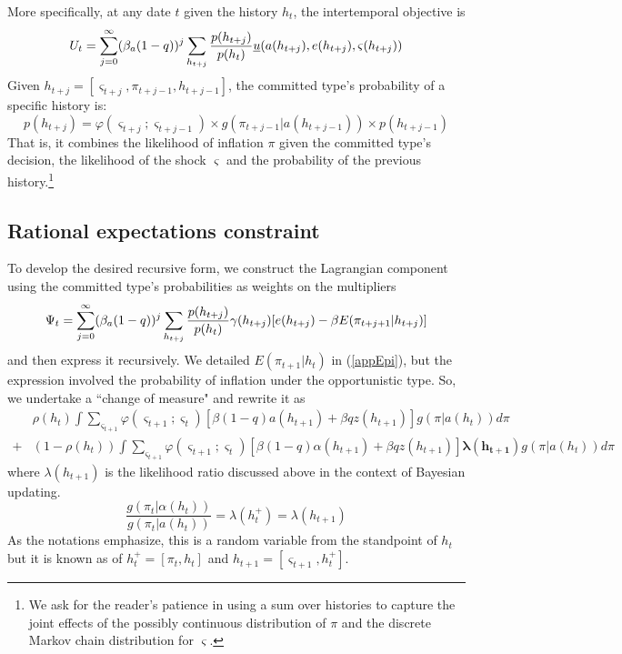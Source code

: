 \documentclass[12pt,letter,leqno]{article}
\theoremstyle{asn}
\theoremstyle{lem}
\theoremstyle{slem}
\theoremstyle{prop}
\theoremstyle{appprop}
\theoremstyle{rem}
\theoremstyle{defn}
\begin{document}
More specifically, at any date $t$ given the history $h_{t}$, the intertemporal objective is
\begin{equation}
U_{t}=\sum_{j=0}^{\infty }(\beta_{a}(1-q))^{j}\sum_{h_{t+j}}\frac{p(h_{t+j})%
}{p(h_{t})}\uline{u}(a(h_{t+j}),e(h_{t+j}),\varsigma (h_{t+j}))
\label{app:intertemporal objective}
\end{equation}%
Given $h_{t+j}=[\varsigma _{t+j},\pi _{t+j-1},h_{t+j-1}]$, the committed type's probability of a specific history is:
\begin{equation}
p(h_{t+j})=\varphi (\varsigma _{t+j};\varsigma_{t+j-1})\times g(\pi
_{t+j-1}|a(h_{t+j-1}))\times p(h_{t+j-1})  \label{prob h evolution}
\end{equation}%
That is, it combines the likelihood of inflation $\pi $ given the committed type's
decision, the likelihood of the shock $\varsigma $ and the probability of
the previous history.\footnote{%
We ask for the reader's patience in using a sum over histories to capture
the joint effects of the possibly continuous distribution of $\pi $ and the
discrete Markov chain distribution for $\varsigma $.}

\subsection{Rational expectations constraint}\label{appsec:recursive7}

To develop the desired recursive form, we construct the Lagrangian component using the committed type's probabilities as weights on the multipliers
\begin{equation}
\Psi_t=\sum_{j=0}^{\infty }(\beta_{a}(1-q))^{j}\sum_{h_{t+j}}\frac{p(h_{t+j})}{%
p(h_{t})}\gamma (h_{t+j})[e(h_{t+j})-\beta E(\pi _{t+j+1}|h_{t+j})]\label{PSI}
\end{equation}%
and then express it recursively. We detailed $ E(\pi _{t+1}|h_{t})$ in (\ref{appEpi}), but the expression involved the probability of inflation under the opportunistic type. So, we undertake a ``change of measure" and rewrite it as 
\begin{align}
&\rho (h_{t})\int \sum_{\varsigma _{t+1}}\varphi
(\varsigma_{t+1};\varsigma_{t})
[\beta (1-q)a(h_{t+1})+\beta qz(h_{t+1})]
g(\pi |a(h_{t}))d\pi  \label{eq:Epi1} \\
+&(1-\rho (h_{t}))\int \sum_{\varsigma _{t+1}}\varphi (\varsigma_{t+1};\varsigma_{t})
[\beta (1-q)\alpha (h_{t+1})+\beta qz(h_{t+1})]
\mathbf{\lambda(h_{t+1})}g(\pi |a(h_{t}))d\pi  \nonumber
\end{align}
where $\lambda(h_{t+1})$ is the likelihood ratio discussed above in the context of Bayesian updating. 
\begin{equation}
\frac{g(\pi _{t}|\alpha (h_{t}))}{g(\pi _{t}|a(h_{t}))}=\lambda
(h_{t}^{+})=\lambda (h_{t+1})\label{LRlambda}
\end{equation}%
As the notations emphasize, this is a random variable from the standpoint of $%
h_{t}$ but it is known as of $h_{t}^{+}=[\pi _{t},h_{t}]$ and $%
h_{t+1}=[\varsigma _{t+1},h_{t}^{+}]$. 
\end{document}
